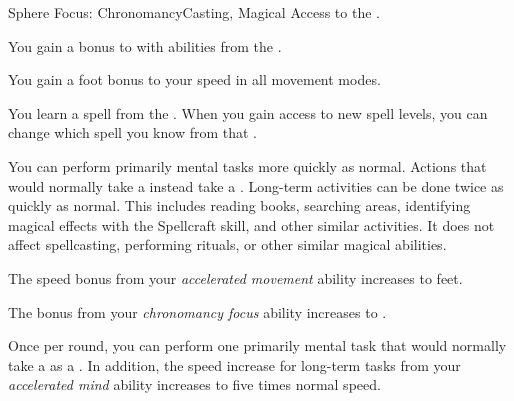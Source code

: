     \begin{feat}{Sphere Focus: Chronomancy}{Casting, Magical}
        \featpre Access to the  .

         You gain a  bonus to  with abilities from the  .

         You gain a  foot bonus to your speed in all movement modes.

         You learn a spell from the  .
        When you gain access to new spell levels, you can change which spell you know from that .

         You can perform primarily mental tasks more quickly as normal.
        Actions that would normally take a  instead take a .
        Long-term activities can be done twice as quickly as normal.
        This includes reading books, searching areas, identifying magical effects with the Spellcraft skill, and other similar activities.
        It does not affect spellcasting, performing rituals, or other similar magical abilities.

         The speed bonus from your \textit{accelerated movement} ability increases to  feet.

         The bonus from your \textit{chronomancy focus} ability increases to .

         Once per round, you can perform one primarily mental task that would normally take a  as a .
        In addition, the speed increase for long-term tasks from your \textit{accelerated mind} ability increases to five times normal speed.
    \end{feat}

